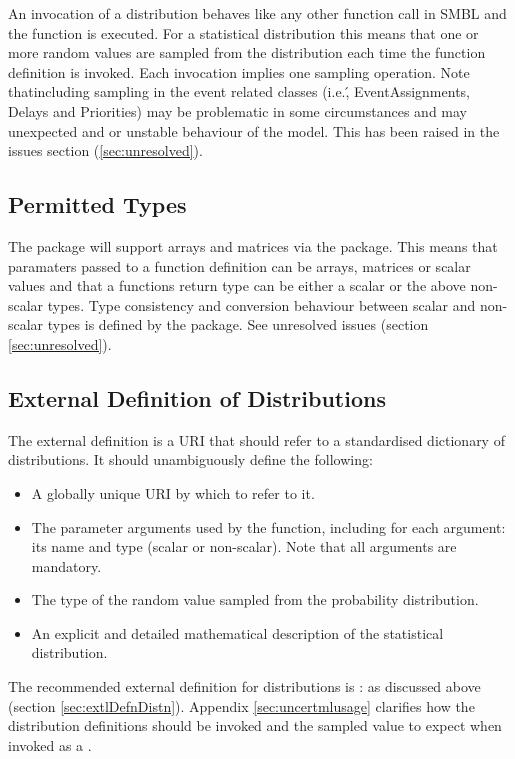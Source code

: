 \documentclass[draftspec]{sbmlpkgspec}
\begin{document}
An invocation of a distribution behaves like any other function call
in SMBL and the function is executed. For a statistical distribution
this means that one or more random values are sampled from the distribution
each time the function definition is invoked. Each invocation implies
one sampling operation. Note that\contraversial including sampling in
the event related classes (i.e.\', EventAssignments, Delays and
Priorities) may be problematic in some circumstances and may
unexpected and or unstable behaviour of the model. This has been
raised in the issues section (\ref{sec:unresolved}).

\subsection{Permitted Types}

The \distrib package will support arrays and matrices via the \arrays
package. This means that paramaters passed to a function definition
can be arrays, matrices or scalar values and that a functions return
type can be either a scalar or the above non-scalar types. Type
consistency and conversion behaviour between scalar and non-scalar
types is defined by the \arrays package. See unresolved issues
(section \ref{sec:unresolved}).

\subsection{External Definition of Distributions}
\label{sec:externaldistdef}

The external definition is a URI that should refer to a standardised
dictionary of distributions. It should unambiguously define the
following:

\begin{itemize}
\item A globally unique URI by which to refer to it.
\item The parameter arguments used by the function, including for each
 argument: its name and type (scalar or non-scalar). Note that all
 arguments are mandatory.
\item The type of the random value sampled from the probability distribution.
\item An explicit and detailed mathematical description of the statistical distribution.
\end{itemize}

The recommended external definition for distributions is \uncertml: as
discussed above (section \ref{sec:extlDefnDistn}). Appendix
\ref{sec:uncertmlusage} clarifies how the distribution definitions
should be invoked and the sampled value to expect when invoked as a
.
\end{document}

